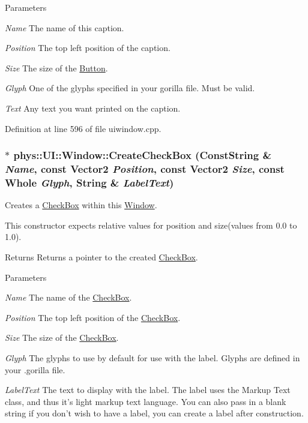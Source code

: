 \begin{DoxyParams}{Parameters}
\item[{\em Name}]The name of this caption. \item[{\em Position}]The top left position of the caption. \item[{\em Size}]The size of the \hyperlink{classphys_1_1UI_1_1Button}{Button}. \item[{\em Glyph}]One of the glyphs specified in your gorilla file. Must be valid. \item[{\em Text}]Any text you want printed on the caption. \end{DoxyParams}


Definition at line 596 of file uiwindow.cpp.

\hypertarget{classphys_1_1UI_1_1Window_af0d9c9d8795ed9b8239dee779aba62ab}{
\subsubsection[{CreateCheckBox}]{ $\ast$ phys::UI::Window::CreateCheckBox ({\bf ConstString} \& {\em Name}, \/  const {\bf Vector2} {\em Position}, \/  const {\bf Vector2} {\em Size}, \/  const {\bf Whole} {\em Glyph}, \/  {\bf String} \& {\em LabelText})}}
\label{d4/d86/classphys_1_1UI_1_1Window_af0d9c9d8795ed9b8239dee779aba62ab}


Creates a \hyperlink{classphys_1_1UI_1_1CheckBox}{CheckBox} within this \hyperlink{classphys_1_1UI_1_1Window}{Window}. 

This constructor expects relative values for position and size(values from 0.0 to 1.0). \begin{DoxyReturn}{Returns}
Returns a pointer to the created \hyperlink{classphys_1_1UI_1_1CheckBox}{CheckBox}. 
\end{DoxyReturn}

\begin{DoxyParams}{Parameters}
\item[{\em Name}]The name of the \hyperlink{classphys_1_1UI_1_1CheckBox}{CheckBox}. \item[{\em Position}]The top left position of the \hyperlink{classphys_1_1UI_1_1CheckBox}{CheckBox}. \item[{\em Size}]The size of the \hyperlink{classphys_1_1UI_1_1CheckBox}{CheckBox}. \item[{\em Glyph}]The glyphs to use by default for use with the label. Glyphs are defined in your .gorilla file. \item[{\em LabelText}]The text to display with the label. The label uses the Markup Text class, and thus it's light markup text language. You can also pass in a blank string if you don't wish to have a label, you can create a label after construction. \end{DoxyParams}


